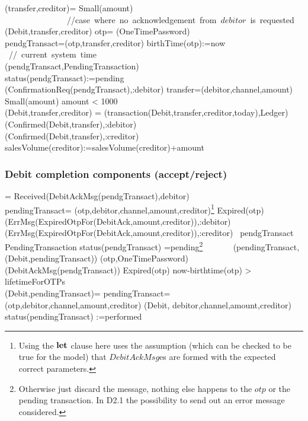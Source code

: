  \begin{asm}
 (transfer,creditor)=\+
 \IF Small(amount) 
 \mbox{ ~~~~~~~~~~~~~  //case where no acknowledgement from $debitor$ is requested}\+
 \THEN ~ (Debit,transfer,creditor) \-
 \ELSE \+
 \LET otp= \NEW(OneTimePassword)\\
 \LET pendgTransact=(otp,transfer,creditor)\+
 birthTime(otp):=now \mbox{ // current system time}\\
 (pendgTransact,PendingTransaction)\\ 
 status(pendgTransact):=pending \\
 (ConfirmationReq(pendgTransact),\TO :debitor)
 \dec\-
 \WHERE \+
 transfer=(debitor,channel,amount)\\
 Small(amount) \IFF amount < 1000 \\
 (Debit,transfer,creditor) =\+     
 (transaction(Debit,transfer,creditor,today),Ledger)\\
 (Confirmed(Debit,transfer),\TO :debitor)\\
 (Confirmed(Debit,transfer),\TO :creditor)\\
 salesVolume(creditor):=salesVolume(creditor)+amount
 \end{asm}
 
 \subsubsection{Debit completion components (accept/reject)}
 
 
 
 \begin{asm}  
  =\+           
 \IF Received(DebitAckMsg(pendgTransact),\FROM debitor) \THEN \\
 \LET pendingTransact= (otp,debitor,channel,amount,creditor)\footnote{Using the $\mathrel{\mathbf{let}}$ clause here uses the assumption (which can be checked to be true for the model) that $DebitAckMsg$es are formed with the expected correct parameters.}\+
 \IF Expired(otp) \THEN \+
 (ErrMsg(ExpiredOtpFor(DebitAck,amount,creditor)),\TO :debitor) \\
 (ErrMsg(ExpiredOtpFor(DebitAck,amount,creditor)),\TO :creditor)\- 
 \ELSE ~\IF pendgTransact  \in PendingTransaction \AND
 status(pendgTransact) =pending\footnote{Otherwise just discard the message, nothing else happens to the $otp$ or the pending transaction. In D2.1 the possibility to send out an error message considered.}  \+
 \THEN \+
 \+
 ~~~~~~ (pendingTransact,(Debit,pendingTransact))\-
 (otp,OneTimePassword)\dec\dec\-  
 (DebitAckMsg(pendgTransact)) \dec\-
 \WHERE \+
 Expired(otp) \IFF now-birthtime(otp) > lifetimeForOTPs\\
 (Debit,pendingTransact)=\+
 \LET pendingTransact=(otp,debitor,channel,amount,creditor)\+
 (Debit, debitor,channel,amount,creditor)\\
 status(pendingTransact) :=performed
 \end{asm}
 
